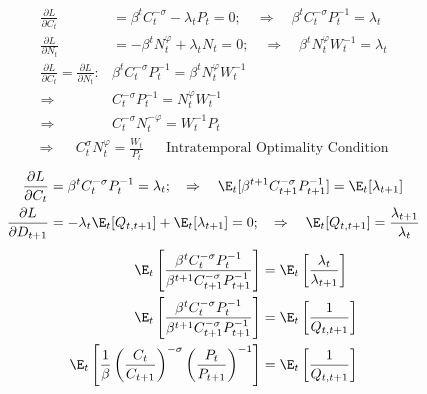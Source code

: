 \begin{align*}
    \frac{\partial L}{\partial C_t}                                    & = \beta^t C_t^{-\sigma} - \lambda_t P_t = 0; \quad \Rightarrow \quad \beta^t C_t^{-\sigma} P_{t}^{-1} = \lambda_t  \\
    \frac{\partial L}{\partial N_t}                                    & = -\beta^t N_t^{\varphi} + \lambda_t N_t = 0; \quad \Rightarrow \quad \beta^t N_t^{\varphi} W_{t}^{-1} = \lambda_t \\
    \frac{\partial L}{\partial C_t} = \frac{\partial L}{\partial N_t}: & \beta^t C_t^{-\sigma} P_{t}^{-1} = \beta^t N_t^{\varphi} W_{t}^{-1}                                                \\
    \Rightarrow                                                        & C_t^{-\sigma} P_{t}^{-1} = N_t^{\varphi} W_{t}^{-1}                                                                \\
    \Rightarrow                                                        & C_t^{-\sigma} N_t^{-\varphi} =  W_{t}^{-1}     P_{t}
\end{align*}
\begin{align}
    \Rightarrow &  & C_t^{\sigma} N_t^{\varphi} =  \frac{W_t}{P_t} \label{eq:intratemporal_optimality_condition} &  & \text{Intratemporal Optimality Condition}
\end{align}
\begin{align*}
    \frac{\partial L}{\partial C_t}     & = \beta^t C_t^{-\sigma} P_{t}^{-1} = \lambda_t; \quad \Rightarrow \quad \E_t[\beta^{t+1} C_{t+1}^{-\sigma} P_{t+1}^{-1}] = \E_t[\lambda_{t+1}] \\
    \frac{\partial L}{\partial D_{t+1}} & = -\lambda_t \E_t[Q_{t,t+1}] + \E_t[\lambda_{t+1}] = 0; \quad \Rightarrow \quad \E_t[Q_{t,t+1}] = \frac{\lambda_{t+1}}{\lambda_t}
\end{align*}
\begin{align*}
    \E_t\left[\frac{\beta^t C_t^{-\sigma} P_{t}^{-1}}{\beta^{t+1} C_{t+1}^{-\sigma} P_{t+1}^{-1}}\right]                 & = \E_t\left[\frac{\lambda_t}{\lambda_{t+1}}\right] \\
    \E_t\left[\frac{\beta^t C_t^{-\sigma} P_{t}^{-1}}{\beta^{t+1} C_{t+1}^{-\sigma} P_{t+1}^{-1}}\right]                 & = \E_t\left[\frac{1}{Q_{t,t+1}}\right]             \\
    \E_t\left[\frac{1}{\beta} \left(\frac{C_t}{C_{t+1}}\right)^{-\sigma} \left(\frac{P_{t}}{ P_{t+1}}\right)^{-1}\right] & = \E_t\left[\frac{1}{Q_{t,t+1}}\right]
\end{align*}
